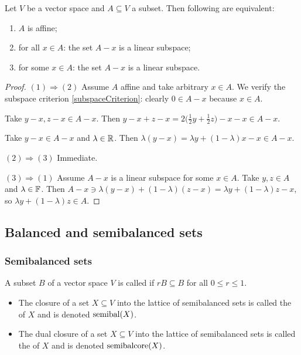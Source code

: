 \begin{proposition}
Let $V$ be a vector space and $A\subseteq V$ a subset. Then following are equivalent:
\begin{enumerate}
\item $A$ is affine;
\item for all $x\in A$: the set $A-x$ is a linear subspace;
\item for some $x\in A$: the set $A-x$ is a linear subspace.
\end{enumerate}
\end{proposition}
\begin{proof}
$(1) \Rightarrow (2)$ Assume $A$ affine and take arbitrary $x\in A$. We verify the subspace criterion \ref{subspaceCriterion}: clearly $0\in A-x$ because $x\in A$.

Take $y-x, z-x \in A-x$. Then $y-x + z-x = 2\Big(\frac{1}{2}y + \frac{1}{2}z\Big) - x -x \in A-x$.

Take $y-x\in A-x$ and $\lambda\in \mathbb{R}$. Then $\lambda(y-x) = \lambda y + (1-\lambda)x - x \in A-x$.

$(2) \Rightarrow (3)$ Immediate.

$(3) \Rightarrow (1)$ Assume $A-x$ is a linear subspace for some $x\in A$. Take $y,z\in A$ and $\lambda\in \mathbb{F}$. Then $A-x \ni \lambda(y-x)+(1-\lambda)(z-x) = \lambda y + (1-\lambda)z - x$, so $\lambda y + (1-\lambda)z \in A$. 
\end{proof}


\subsection{Balanced and semibalanced sets}
\subsubsection{Semibalanced sets}
\begin{definition}
A subset $B$ of a vector space $V$ is called  if $rB \subseteq B$ for all $0\leq r \leq 1$.

\begin{itemize}
\item The closure of a set $X\subseteq V$ into the lattice of semibalanced sets is called the  of $X$ and is denoted $\operatorname{semibal}(X)$.
\item The dual closure of a set $X\subseteq V$ into the lattice of semibalanced sets is called the  of $X$ and is denoted $\operatorname{semibalcore}(X)$.
\end{itemize}
\end{definition}

